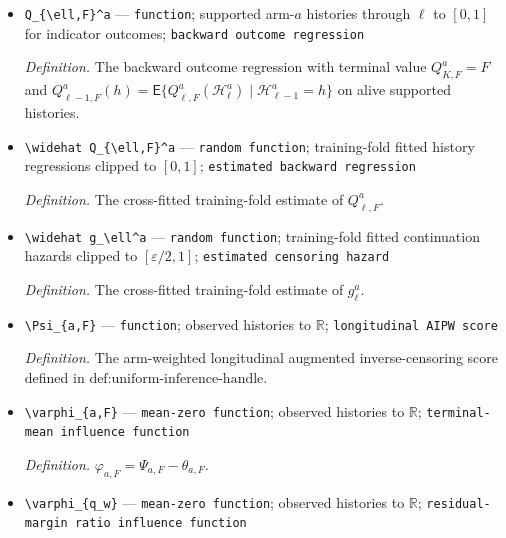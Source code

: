 \documentclass{article}
\begin{document}
\begin{itemize}
  \item \texttt{Q\_\allowbreak{}\{\textbackslash{}\allowbreak{}ell,\allowbreak{}F\}\allowbreak{}\textasciicircum{}a} --- \texttt{function}; supported arm-\(a\) histories through \(\ell\) to \([0,1]\) for indicator outcomes; \texttt{backward outcome regression}
  \par\smallskip\noindent\emph{Definition.} The backward outcome regression with terminal value \(Q_{K,F}^a=F\) and \(Q_{\ell-1,F}^a(h)=\mathsf E\{Q_{\ell,F}^a(\mathcal H_\ell^a)\mid\mathcal H_{\ell-1}^a=h\}\) on alive supported histories.
  \item \texttt{\textbackslash{}\allowbreak{}widehat Q\_\allowbreak{}\{\textbackslash{}\allowbreak{}ell,\allowbreak{}F\}\allowbreak{}\textasciicircum{}a} --- \texttt{random function}; training-fold fitted history regressions clipped to \([0,1]\); \texttt{estimated backward regression}
  \par\smallskip\noindent\emph{Definition.} The cross-fitted training-fold estimate of \(Q_{\ell,F}^a\).
  \item \texttt{\textbackslash{}\allowbreak{}widehat g\_\allowbreak{}\textbackslash{}\allowbreak{}ell\textasciicircum{}a} --- \texttt{random function}; training-fold fitted continuation hazards clipped to \([\varepsilon/2,1]\); \texttt{estimated censoring hazard}
  \par\smallskip\noindent\emph{Definition.} The cross-fitted training-fold estimate of \(g_\ell^a\).
  \item \texttt{\textbackslash{}\allowbreak{}Psi\_\allowbreak{}\{a,\allowbreak{}F\}\allowbreak{}} --- \texttt{function}; observed histories to \(\mathbb R\); \texttt{longitudinal AIPW score}
  \par\smallskip\noindent\emph{Definition.} The arm-weighted longitudinal augmented inverse-censoring score defined in \(\text{def:uniform-inference-handle}\).
  \item \texttt{\textbackslash{}\allowbreak{}varphi\_\allowbreak{}\{a,\allowbreak{}F\}\allowbreak{}} --- \texttt{mean-\allowbreak{}zero function}; observed histories to \(\mathbb R\); \texttt{terminal-\allowbreak{}mean influence function}
  \par\smallskip\noindent\emph{Definition.} \(\varphi_{a,F}=\Psi_{a,F}-\theta_{a,F}\).
  \item \texttt{\textbackslash{}\allowbreak{}varphi\_\allowbreak{}\{q\_\allowbreak{}w\}\allowbreak{}} --- \texttt{mean-\allowbreak{}zero function}; observed histories to \(\mathbb R\); \texttt{residual-\allowbreak{}margin ratio influence function}

\end{itemize}
\end{document}
